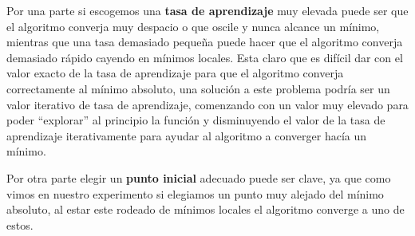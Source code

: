 \documentclass[size=a4, parskip=half, titlepage=false, toc=flat, toc=bib, 12pt]{scrartcl}
\begin{document}
\begin{enumerate}
Por una parte si escogemos una \textbf{tasa de aprendizaje} muy elevada puede ser que el algoritmo converja
muy despacio o que oscile y nunca alcance un mínimo, mientras que una tasa demasiado pequeña puede hacer
que el algoritmo converja demasiado rápido cayendo en mínimos locales. Esta claro que es difícil dar con
el valor exacto de la tasa de aprendizaje para que el algoritmo converja correctamente al mínimo absoluto,
una solución a este problema podría ser un valor iterativo de tasa de aprendizaje, comenzando con un valor
muy elevado para poder ``explorar'' al principio la función y disminuyendo el valor de la tasa de aprendizaje
iterativamente para ayudar al algoritmo a converger hacía un mínimo.

Por otra parte elegir un \textbf{punto inicial} adecuado puede ser clave, ya que como vimos en nuestro experimento
si elegiamos un punto muy alejado del mínimo absoluto, al estar este rodeado de mínimos locales el algoritmo
converge a uno de estos.
\end{enumerate}
\end{document}
